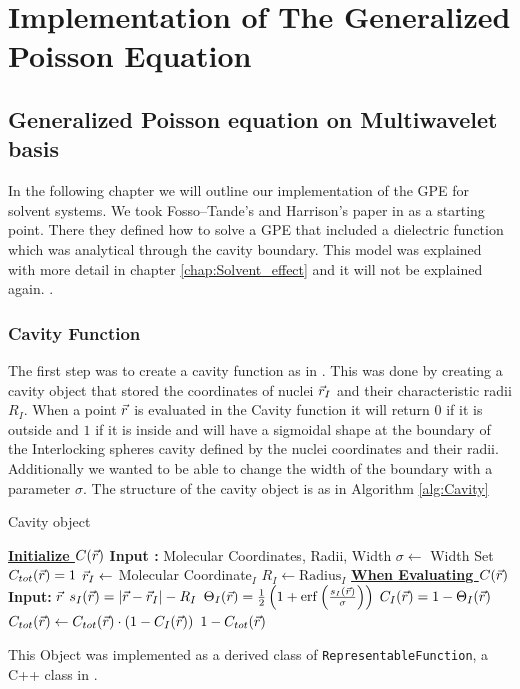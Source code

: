 \documentclass[../master_thesis.tex]{subfiles}
\begin{document}
\chapter{Implementation of The Generalized Poisson Equation}\label{chap:implementation}
\section{Generalized Poisson equation on Multiwavelet basis}
In the following chapter we will outline our implementation of the \ac{GPE}
for solvent systems. We took Fosso--Tande's and Harrison's
paper in \cite{FossoTande:2013ka} as a starting point. There they defined
how to solve a \ac{GPE} that included a dielectric function which was analytical
through the cavity boundary. This model was explained with more detail in chapter \ref{chap:Solvent_effect} and
it will not be explained again.
\mrchem.
\subsection{Cavity Function}
The first step was to create a cavity function as in \cite{FossoTande:2013ka}.
This was done by creating a cavity object that stored the coordinates of nuclei
$\vec{r}_I$ and their characteristic radii $R_I$. When a point $\vec{r}$ is evaluated
in the Cavity function it will return $0$ if it is outside and $1$ if
it is inside  and will have a sigmoidal shape at the boundary  of the
Interlocking spheres cavity defined by the nuclei coordinates and their radii.
Additionally we wanted to be able to change the width of the
boundary with a parameter $\sigma$. The structure of the cavity object is as
in Algorithm \ref{alg:Cavity}

\begin{algorithm}
  \caption{Cavity object}\label{alg:Cavity}
  \begin{algorithmic}
    \STATE \underline{\textbf{Initialize $C(\vec{r})$}}
    \STATE \textbf{Input :} Molecular Coordinates, Radii, Width
    \STATE $\sigma \leftarrow $ Width
    \STATE Set $C_{tot}(\vec{r}) = 1$
     \STATE $\vec{r}_I \leftarrow $ Molecular Coordinate$_I$
     \STATE $R_I \leftarrow \text{Radius}_I$
    \ENDFOR
    \STATE
    \STATE \underline{\textbf{When Evaluating $C(\vec{r})$}}
    \STATE \textbf{Input: } $\vec{r}$
      \STATE $s_I(\vec{r}) = \abs{\vec{r} - \vec{r}_I} - R_I$
      \STATE $\Theta_I(\rvec) = \frac{1}{2}\left(1 + \erf\left(\frac{s_I(\rvec)}{\sigma}\right)\right)$
      \STATE $ C_I(\vec{r}) = 1 -\Theta_I(\vec{r}) $
      \STATE $ C_{tot}(\vec{r}) \leftarrow C_{tot}(\vec{r}) \cdot (1 - C_{I}(\vec{r}))$
    \ENDFOR
    \RETURN $ 1 - C_{tot}(\vec{r})$
  \end{algorithmic}
\end{algorithm}
This Object was implemented as a derived class of \verb!RepresentableFunction!,
a C++ class in \mrchem.
\end{document}
